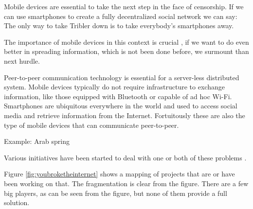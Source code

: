 Mobile devices are essential to take the next step in the face of censorship.
If we can use smartphones to create a fully decentralized social network we can say:
The only way to take Tribler down is to take everybody's smartphones away.

The importance of mobile devices in this context is crucial , if we want to do even better in spreading information, which is not been done before, we surmount than next hurdle.

Peer-to-peer communication technology is essential for a server-less distributed system.
Mobile devices typically do not require infrastructure to exchange information, like those equipped with Bluetooth or capable of ad hoc Wi-Fi.
Smartphones are ubiquitous everywhere in the world and used to access social media and retrieve information from the Internet.
Fortuitously these are also the type of mobile devices that can communicate peer-to-peer.

Example: Arab spring \cite{pouwelse2012censorshipfree}


Various initiatives have been started to deal with one or both of these problems \cite{redecentralize2015alternativeinternet}.

Figure \ref{fig:youbroketheinternet} shows a mapping of projects that are or have been working on that.
The fragmentation is clear from the figure.
There are a few big players, as can be seen from the figure, but none of them provide a full solution.






